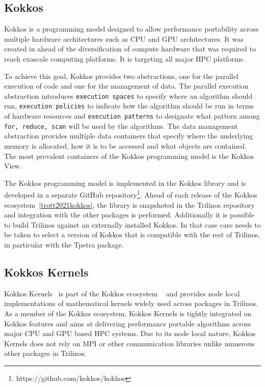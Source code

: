 


\subsection{Kokkos}\label{subsec:kokkos}
Kokkos is a programming model designed to allow performance portability across multiple
hardware architectures such as CPU and GPU architectures. It was created in ahead of the
diversification of compute hardware that was required to reach exascale computing
platforms. It is targeting all major HPC platforms.

To achieve this goal, Kokkos provides two abstractions, one for the parallel execution
of code and one for the management of data. The parallel execution abstraction introduces
\texttt{execution spaces} to specify where an algorithm should run, \texttt{execution
policies} to indicate how the algorithm should be run in terms of hardware resources and
\texttt{execution patterns} to designate what pattern among \texttt{for, reduce, scan}
will be used by the algorithms. The data management abstraction provides multiple data
containers that specify where the underlying memory is allocated, how it is to be
accessed and what objects are contained. The most prevalent containers of the Kokkos
programming model is the Kokkos View.

The Kokkos programming model is implemented in the Kokkos library and is developed in a
separate GitHub repository\footnote{https://github.com/kokkos/kokkos}. Ahead of each
release of the Kokkos ecosystem~\ref{trott2021kokkos}, the library is snapshoted in the
Trilinos repository and integration with the other packages is performed. Additionally
it is possible to build Trilinos against an externally installed Kokkos. In that case
care needs to be taken to select a version of Kokkos that is compatible with the rest
of Trilinos, in particular with the Tpetra package.

\subsection{Kokkos Kernels}\label{subsec:kk}
Kokkos Kernels~\cite{rajamanickam2021kokkoskernels} is part of the Kokkos ecosystem
~\cite{trott2021kokkos} and provides node local implementations of mathematical kernels
widely used across packages in Trilinos. As a member of the Kokkos
ecosystem, Kokkos Kernels is tightly integrated on Kokkos features and aims at
delivering performance portable algorithms across major CPU and GPU based HPC systems.
Due to its node local nature, Kokkos Kernels does not rely on MPI or other communication
libraries unlike numerous other packages in Trilinos.

